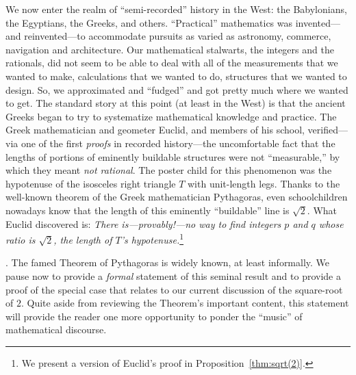 \noindent
We now enter the realm of ``semi-recorded'' history in the West: the
Babylonians, the Egyptians, the Greeks, and others.  ``Practical''
mathematics was invented---and reinvented---to accommodate pursuits as
varied as astronomy, commerce, navigation and architecture.  Our
mathematical stalwarts, the integers and the rationals, did not seem
to be able to deal with all of the measurements that we wanted to
make, calculations that we wanted to do, structures that we wanted to
design.  So, we approximated and ``fudged'' and got pretty much where
we wanted to get.  The standard story at this point (at least in the
West) is that the ancient Greeks began to try to systematize
mathematical knowledge and practice.  The Greek mathematician and
geometer Euclid,  and members of his school,
verified---via one of the first {\em proofs} in recorded history---the
uncomfortable fact that the lengths of portions of eminently buildable
structures were not ``measurable,'' by which they meant {\em not
  rational}.  The poster child for this phenomenon was the hypotenuse
of the isosceles right triangle $T$ with unit-length legs.  Thanks to
the well-known theorem of the Greek mathematician Pythagoras,
 even schoolchildren nowadays know that the length
of this eminently ``buildable'' line is $\sqrt{2}$.  What Euclid
discovered is: {\em There is---provably!---no way to find integers $p$
  and $q$ whose ratio is $\sqrt{2}$, the length of $T$'s
  hypotenuse.}\footnote{We present a version of Euclid's proof in
  Proposition~\ref{thm:sqrt(2)}.}

\medskip

.
The famed Theorem of Pythagoras is widely known, at least informally.
We pause now to provide a {\em formal} statement of this seminal
result and to provide a proof of the special case that relates to our
current discussion of the square-root of $2$.  Quite aside from
reviewing the Theorem's important content, this statement will provide
the reader one more opportunity to ponder the ``music'' of
mathematical discourse.

